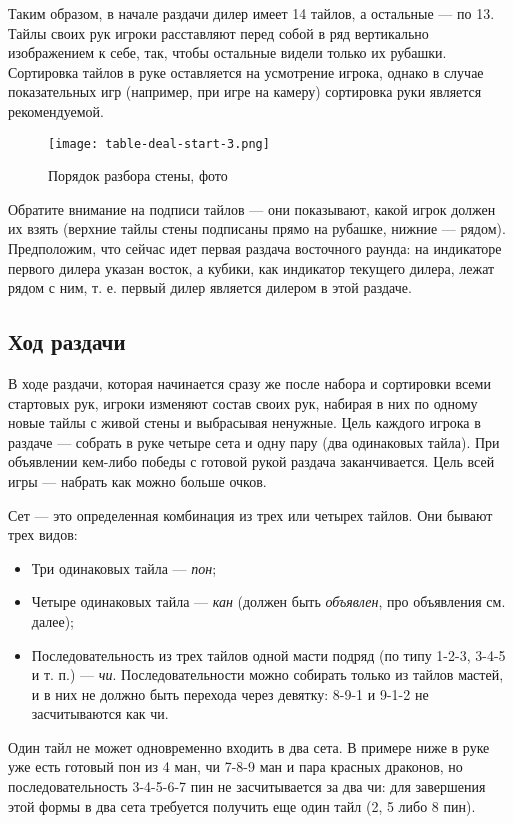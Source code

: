 Таким образом, в начале раздачи дилер имеет 14 тайлов, а остальные --- по 13. Тайлы своих рук игроки расставляют перед собой в ряд вертикально изображением к себе, так, чтобы остальные видели только их рубашки. Сортировка тайлов в руке оставляется на усмотрение игрока, однако в случае показательных игр (например, при игре на камеру) сортировка руки является рекомендуемой.

\begin{figure}[H]
	\centering
	\texttt{[image: table-deal-start-3.png]}
	\caption{Порядок разбора стены, фото}
\end{figure}

Обратите внимание на подписи тайлов --- они показывают, какой игрок должен их взять (верхние тайлы стены подписаны прямо на рубашке, нижние --- рядом). Предположим, что сейчас идет первая раздача восточного раунда: на индикаторе первого дилера указан восток, а кубики, как индикатор текущего дилера, лежат рядом с ним, т. е. первый дилер является дилером в этой раздаче.

\subsection{Ход раздачи}

В ходе раздачи, которая начинается сразу же после набора и сортировки всеми стартовых рук, игроки изменяют состав своих рук, набирая в них по одному новые тайлы с живой стены и выбрасывая ненужные. Цель каждого игрока в раздаче --- собрать в руке четыре сета и одну пару (два одинаковых тайла). При объявлении кем-либо победы с готовой рукой раздача заканчивается. Цель всей игры --- набрать как можно больше очков.

Сет --- это определенная комбинация из трех или четырех тайлов. Они бывают трех видов:
\begin{itemize}
	\item Три одинаковых тайла --- \textit{пон};
	\item Четыре одинаковых тайла --- \textit{кан} (должен быть \textit{объявлен}, про объявления см. далее);
	\item Последовательность из трех тайлов одной масти подряд (по типу 1-2-3, 3-4-5 и т. п.) --- \textit{чи}. Последовательности можно собирать только из тайлов мастей, и в них не должно быть перехода через девятку: 8-9-1 и 9-1-2 не засчитываются как чи.
\end{itemize}

Один тайл не может одновременно входить в два сета. В примере ниже в руке уже есть готовый пон из 4 ман, чи 7-8-9 ман и пара красных драконов, но последовательность 3-4-5-6-7 пин не засчитывается за два чи: для завершения этой формы в два сета требуется получить еще один тайл (2, 5 либо 8 пин).

